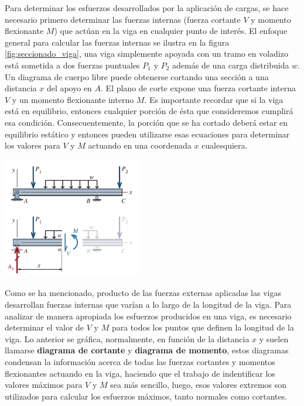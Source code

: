 \documentclass[12pt,letterpaper]{article}
\begin{document}
Para determinar los esfuerzos desarrollados por la aplicación de cargas, se hace necesario primero determinar 
las fuerzas internas (fuerza cortante $V$ y momento flexionante $M$) que actúan en la viga en cualquier punto de 
interés. El enfoque general para calcular las fuerzas internas se ilustra en la figura \ref{fig:seccionado_viga}, 
una viga simplemente apoyada con un tramo en voladizo está sometida a dos fuerzas puntuales $P_1$ y $P_2$ además de 
una carga distribuida $w$. Un diagrama de cuerpo libre puede obtenerse cortando una sección a una distancia $x$ del 
apoyo en $A$. El plano de corte expone una fuerza cortante interna $V$ y un momento flexionante interno $M$. 
Es importante recordar que si la viga está en equilibrio, entonces cualquier porción de ésta que consideremos cumplirá 
esa condición. Consecuentemente, la porción que se ha cortado deberá estar en equilibrio estático y entonces pueden 
utilizarse esas ecuaciones para determinar los valores para $V$ y $M$ actuando en una coordenada $x$ cualesquiera.

\begin{center}
\includegraphics[width=0.45\textwidth]{img/seccionado_viga.PNG}
\label{fig:seccionado_viga}
\end{center}

Como se ha mencionado, producto de las fuerzas externas aplicadas las vigas desarrollan fuerzas internas que varían 
a lo largo de la longitud de la viga. Para analizar de manera apropiada los esfuerzos producidos en una viga, es necesario 
determinar el valor de $V$ y $M$ para todos los puntos que definen la longitud de la viga. Lo anterior se gráfica, normalmente, 
en función de la distancia $x$ y suelen llamarse \textbf{diagrama de cortante} y \textbf{diagrama de momento}, estos 
diagramas condensan la información acerca de todas las fuerzas cortantes y momentos flexionantes actuando en la viga, 
haciendo que el trabajo de indentificar los valores máximos para $V$ y $M$ sea más sencillo, luego, esos valores 
extremos son utilizados para calcular los esfuerzos máximos, tanto normales como cortantes.
\end{document}
